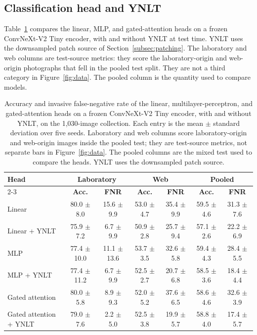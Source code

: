 \documentclass[final,3p,times,twocolumn]{elsarticle}
\begin{document}
\subsection{Classification head and YNLT}
\label{subsec:heads}

Table~\ref{tab:heads} compares the linear, MLP, and gated-attention heads on a frozen ConvNeXt-V2 Tiny encoder, with and without YNLT at test time. YNLT uses the downsampled patch source of Section~\ref{subsec:patching}. The laboratory and web columns are test-source metrics: they score the laboratory-origin and web-origin photographs that fell in the pooled test split. They are not a third category in Figure~\ref{fig:data}. The pooled column is the quantity used to compare models.

\begin{table}[!ht]
    \caption{Accuracy and invasive false-negative rate of the linear, multilayer-perceptron, and gated-attention heads on a frozen ConvNeXt-V2 Tiny encoder, with and without YNLT, on the 1{,}030-image collection. Each entry is the mean \(\pm\) standard deviation over five seeds. Laboratory and web columns score laboratory-origin and web-origin images inside the pooled test; they are test-source metrics, not separate bars in Figure~\ref{fig:data}. The pooled columns are the mixed test used to compare the heads. YNLT uses the downsampled patch source.}
    \label{tab:heads}
    \renewcommand{\arraystretch}{1.25}
    \centering
    \small
    \begin{tabular}{lcccccc}
        \hline
        \multirow{2}{*}{\textbf{Head}} & \multicolumn{2}{c}{\textbf{Laboratory}} & \multicolumn{2}{c}{\textbf{Web}} & \multicolumn{2}{c}{\textbf{Pooled}} \\
        \cline{2-3} \cline{4-5} \cline{6-7}
        & \textbf{Acc.} & \textbf{FNR} & \textbf{Acc.} & \textbf{FNR} & \textbf{Acc.} & \textbf{FNR} \\
        \hline
        Linear & 80.0 $\pm$ 8.0 & 15.6 $\pm$ 9.9 & 53.0 $\pm$ 4.7 & 35.4 $\pm$ 9.9 & 59.5 $\pm$ 4.6 & 31.3 $\pm$ 7.6 \\
        Linear + YNLT & 75.9 $\pm$ 7.2 & 6.7 $\pm$ 9.9 & 50.9 $\pm$ 2.8 & 25.7 $\pm$ 9.4 & 57.1 $\pm$ 2.6 & 22.2 $\pm$ 6.9 \\
        MLP & 77.4 $\pm$ 10.0 & 11.1 $\pm$ 13.6 & 53.7 $\pm$ 3.5 & 32.6 $\pm$ 5.8 & 59.4 $\pm$ 4.3 & 28.4 $\pm$ 5.5 \\
        MLP + YNLT & 77.4 $\pm$ 11.2 & 6.7 $\pm$ 9.9 & 52.5 $\pm$ 2.7 & 20.7 $\pm$ 6.8 & 58.5 $\pm$ 3.6 & 18.4 $\pm$ 4.4 \\
        Gated attention & 80.0 $\pm$ 5.8 & 8.9 $\pm$ 9.3 & 52.0 $\pm$ 5.2 & 37.6 $\pm$ 6.5 & 58.6 $\pm$ 4.6 & 32.6 $\pm$ 3.9 \\
        Gated attention + YNLT & 79.0 $\pm$ 7.6 & 2.2 $\pm$ 5.0 & 52.5 $\pm$ 3.8 & 19.9 $\pm$ 5.7 & 58.8 $\pm$ 4.0 & 17.4 $\pm$ 5.7 \\
        \hline
    \end{tabular}
\end{table}
\end{document}
